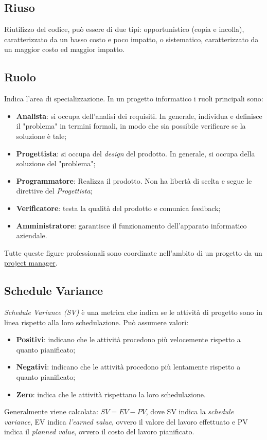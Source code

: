 	\subsection{Riuso}
	\label{sec:riuso}
	Riutilizzo del codice, può essere di due tipi: opportunistico (copia e incolla), caratterizzato da un basso costo e poco impatto, o sistematico, caratterizzato da un maggior costo ed maggior impatto.


	\subsection{Ruolo}
	\label{sec:ruolo}
	Indica l'area di specializzazione.
	In un progetto informatico i ruoli principali sono:
	\begin{itemize}
	\item \textbf{Analista}: si occupa dell'analisi dei requisiti. In generale, individua e definisce il "problema" in termini formali, in modo che sia possibile verificare se la soluzione è tale;
	\item \textbf{Progettista}: si occupa del \emph{design} del prodotto. In generale, si occupa della soluzione del "problema";
	\item \textbf{Programmatore}: Realizza il prodotto. Non ha libertà di scelta e segue le direttive del \emph{Progettista};
	\item \textbf{Verificatore}: testa la qualità del prodotto e comunica feedback;
	\item \textbf{Amministratore}: garantisce il funzionamento dell'apparato informatico aziendale.
	\end{itemize}
	Tutte queste figure professionali sono coordinate nell'ambito di un progetto da un \underline{\hyperref[sec:projectmanager]{project manager}}.


	\newpage


	\subsection{Schedule Variance}
	\label{sec:schedulevariance}
	\emph{Schedule Variance (SV)} è una metrica che indica se le attività di progetto sono in linea rispetto alla loro schedulazione.
	Può assumere valori:
	\begin{itemize}
	\item \textbf{Positivi}: indicano che le attività procedono più velocemente rispetto a quanto pianificato;
	\item \textbf{Negativi}: indicano che le attività procedono più lentamente rispetto a quanto pianificato;
	\item \textbf{Zero}: indica che le attività rispettano la loro schedulazione.
	\end{itemize}
	Generalmente viene calcolata: $SV = EV - PV$,
	dove SV indica la \emph{schedule variance}, EV indica \emph{l'earned value}, ovvero il valore del lavoro effettuato e PV indica il \emph{planned value}, ovvero il costo del lavoro pianificato.


